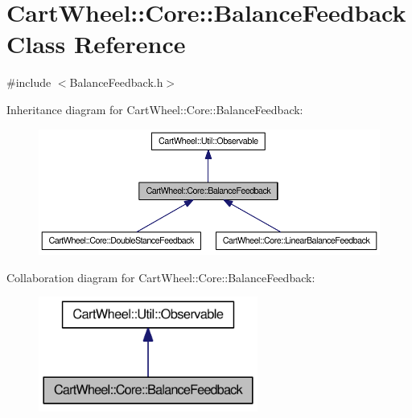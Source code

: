 \hypertarget{classCartWheel_1_1Core_1_1BalanceFeedback}{
\section{CartWheel::Core::BalanceFeedback Class Reference}
\label{classCartWheel_1_1Core_1_1BalanceFeedback}
}


{\ttfamily \#include $<$BalanceFeedback.h$>$}



Inheritance diagram for CartWheel::Core::BalanceFeedback:\nopagebreak
\begin{figure}[H]
\begin{center}
\leavevmode
\includegraphics[width=400pt]{classCartWheel_1_1Core_1_1BalanceFeedback__inherit__graph}
\end{center}
\end{figure}


Collaboration diagram for CartWheel::Core::BalanceFeedback:\nopagebreak
\begin{figure}[H]
\begin{center}
\leavevmode
\includegraphics[width=204pt]{classCartWheel_1_1Core_1_1BalanceFeedback__coll__graph}
\end{center}
\end{figure}

